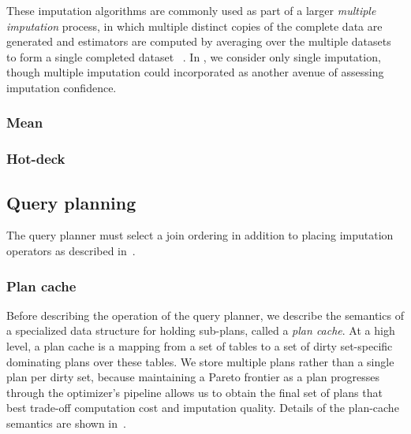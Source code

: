 These imputation algorithms are commonly used as part of a larger \textit{multiple imputation}
process, in which multiple distinct copies of the complete data are generated and estimators
are computed by averaging over the multiple datasets to form a single completed dataset~
\cite{gelman2006data}. In \ProjectName{}, we consider only single imputation, though
multiple imputation could incorporated as another avenue of assessing imputation confidence.

\subsubsection{Mean}


\subsubsection{Hot-deck}


%    

\subsection{Query planning}
\label{sec:planning}
The query planner must select a join ordering in addition to placing imputation operators as described in~.

\subsubsection{Plan cache}
Before describing the operation of the query planner, we describe the semantics of a specialized data structure for holding sub-plans, called a \emph{plan cache}.
At a high level, a plan cache is a mapping from a set of tables to a set of dirty set-specific dominating plans over these tables.
We store multiple plans rather than a single plan per dirty set, because maintaining a Pareto frontier as a plan progresses through the optimizer's pipeline
allows us to obtain the final set of plans that best trade-off computation
cost and imputation quality. Details of the plan-cache semantics are shown in~.



